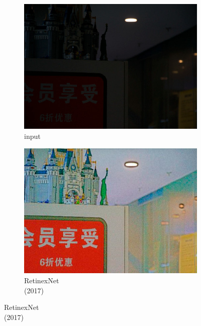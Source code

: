\documentclass[letterpaper,12pt]{article}
\begin{document}
			\begin{figure}[htbp] 
				\centering 
				\begin{subfigure}{0.19\textwidth}
					\includegraphics[width=\linewidth]{VE-LOL-L/input}
					\captionsetup{font=scriptsize}
					\caption{input \\ \quad }
					\label{fig: input}
				\end{subfigure}
				\begin{subfigure}{0.19\textwidth}
					\includegraphics[width=\linewidth]{VE-LOL-L/RetinexNet}
					\captionsetup{font=scriptsize}
					\caption{RetinexNet \\ (2017)}
					\label{fig: LLNet}	
				\end{subfigure}

\end{figure}
\end{document}
